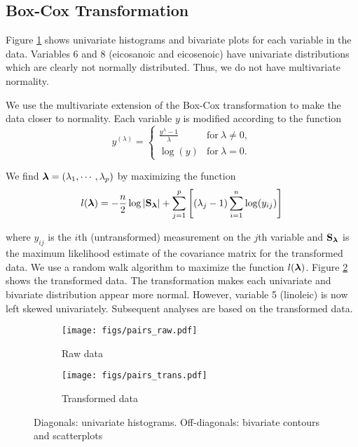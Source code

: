 \subsection{Box-Cox Transformation}

Figure \ref{pairs_raw} shows univariate histograms and bivariate plots for each variable in the data. Variables 6 and 8 (eicosanoic and eicosenoic) have univariate distributions which are clearly not normally distributed. Thus, we do not have multivariate normality.

We use the multivariate extension of the Box-Cox transformation to make the data closer to normality. Each variable $y$ is modified according to the function
\[y^{(\lambda)} = \left\{\begin{array}{ll} \frac{y^\lambda-1}{\lambda} & \mathrm{for}\ \lambda\neq0,\\
\log(y) & \mathrm{for}\ \lambda=0. \end{array} \right.\]

\noindent We find $\mathbf{\bm{\lambda}}=(\lambda_1,\cdots,\lambda_p)$ by maximizing the function
\[l(\mathbf{\bm{\lambda}})=-\frac{n}{2}\log|\mathbf{\bm{S_{\mathbf{\bm{\lambda}}}}}|+\sum_{j=1}^p\left[(\lambda_j-1)\sum_{i=1}^n\log(y_{ij})\right] \]

\noindent where $y_{ij}$ is the $i$th (untransformed) measurement on the $j$th variable and $\mathbf{\bm{S_{\mathbf{\bm{\lambda}}}}}$ is the maximum likelihood estimate of the covariance matrix for the transformed data. We use a random walk algorithm to maximize the function $l(\mathbf{\bm{\lambda}})$. Figure \ref{pairs_trans} shows the transformed data. The transformation makes each univariate and bivariate distribution appear more normal. However, variable 5 (linoleic) is now left skewed univariately. Subsequent analyses are based on the transformed data.

\begin{figure}
    \centering
    \begin{subfigure}{.5\textwidth}
        \centering
        \texttt{[image: figs/pairs\_raw.pdf]}
        \caption{Raw data}
        \label{pairs_raw}
    \end{subfigure}%
    \begin{subfigure}{.5\textwidth}
        \centering
        \texttt{[image: figs/pairs\_trans.pdf]}
        \caption{Transformed data}
        \label{pairs_trans}
    \end{subfigure}
    \caption{Diagonals: univariate histograms. Off-diagonals: bivariate contours and scatterplots}
    \label{pairs_both}
\end{figure}
